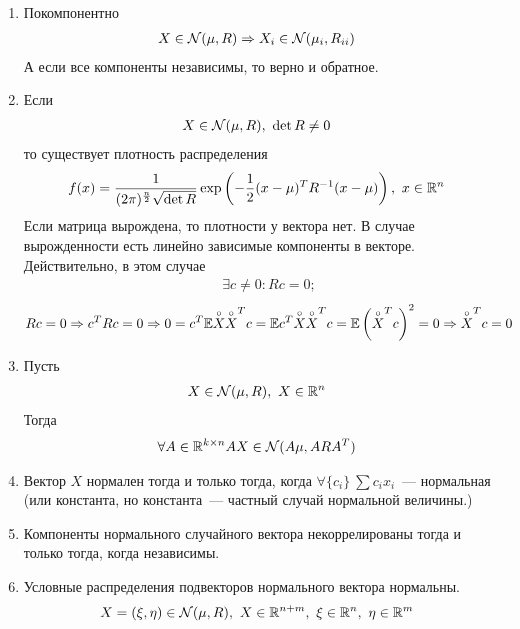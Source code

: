 \begin{enumerate}
    \item Покомпонентно
    \begin{align*}
      & X \in \mathcal{N}(\mu, R) \Rightarrow X_i \in \mathcal{N}(\mu_i, R_{ii})
    \end{align*}
    А если все компоненты независимы, то верно и обратное.
    \item Если
    \begin{align*}
      & X \in \mathcal{N}(\mu, R), \ \det R \neq 0
    \end{align*}
    то существует плотность распределения
    \begin{align*}
      & f(x) = \frac{1}{(2\pi)^{\frac{n}{2}}\sqrt{\det R}}\exp \left( -\frac{1}{2}(x-\mu)^TR^{-1}(x-\mu) \right), \ x \in \mathbb{R}^n
    \end{align*}
    Если матрица вырождена, то плотности у вектора нет. В случае вырожденности
    есть линейно зависимые компоненты в векторе. Действительно, в этом случае
    \begin{align*}
      & \exists c \neq 0: Rc = 0;
    \end{align*}
    \begin{align*}
      & Rc = 0 \Rightarrow c^TRc = 0 \Rightarrow 0 = c^T \mathbb{E} \overset{\circ}{X}\overset{\circ}{X}^Tc = \mathbb{E} c^T \overset{\circ}{X}\overset{\circ}{X}^Tc = \mathbb{E}\left( \overset{\circ}{X}^Tc \right)^2 = 0 \Rightarrow \overset{\circ}{X}^Tc = 0
    \end{align*}
    \item Пусть
    \begin{align*}
      & X \in \mathcal{N}(\mu, R), \ X \in \mathbb{R}^n
    \end{align*}
    Тогда
    \begin{align*}
      & \forall A \in \mathbb{R}^{k\times n} AX \in \mathcal{N}(A\mu, ARA^T)
    \end{align*}
    \item Вектор $X$ нормален тогда и только тогда, когда $\forall \{c_i\} \
    \sum c_ix_i$~--- нормальная (или константа, но константа~--- частный случай
    нормальной величины.)
    \item Компоненты нормального случайного вектора некоррелированы тогда и
    только тогда, когда независимы.
    \item Условные распределения подвекторов нормального вектора нормальны.
    \begin{align*}
      & X = \left( \xi, \eta \right) \in \mathcal{N}(\mu, R), \ X \in \mathbb{R}^{n+m}, \ \xi \in \mathbb{R}^n, \ \eta \in \mathbb{R}^m
    \end{align*}
    \begin{align*}

\end{align*}
\end{enumerate}
